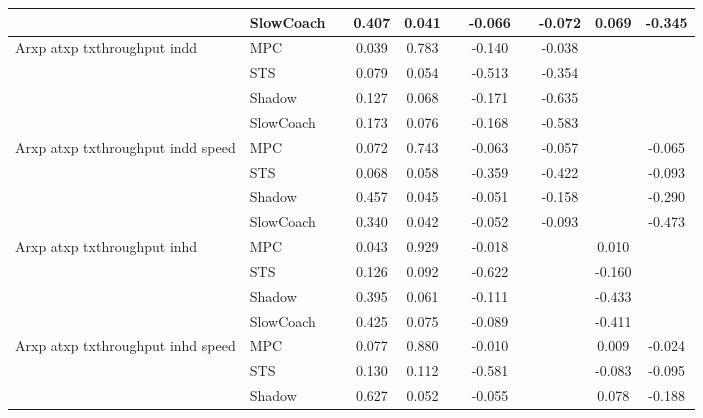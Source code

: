 \begin{tabular}{|l|l|*{9}{c|}}
                              & SlowCoach &       &     0.407 &     0.041 &     & -0.066 &     &  -0.072 &   0.069 &   -0.345 \\
\midrule
Arxp atxp txthroughput indd    & MPC &       &     0.039 &     0.783 &     & -0.140 &     &  -0.038 &      &       \\
                              & STS &       &     0.079 &     0.054 &     & -0.513 &     &  -0.354 &      &       \\
                              & Shadow &       &     0.127 &     0.068 &     & -0.171 &     &  -0.635 &      &       \\
                              & SlowCoach &       &     0.173 &     0.076 &     & -0.168 &     &  -0.583 &      &       \\
\midrule
Arxp atxp txthroughput indd speed    & MPC &       &     0.072 &     0.743 &     & -0.063 &     &  -0.057 &      &   -0.065 \\
                              & STS &       &     0.068 &     0.058 &     & -0.359 &     &  -0.422 &      &   -0.093 \\
                              & Shadow &       &     0.457 &     0.045 &     & -0.051 &     &  -0.158 &      &   -0.290 \\
                              & SlowCoach &       &     0.340 &     0.042 &     & -0.052 &     &  -0.093 &      &   -0.473 \\
\midrule
Arxp atxp txthroughput inhd    & MPC &       &     0.043 &     0.929 &     & -0.018 &     &      &   0.010 &       \\
                              & STS &       &     0.126 &     0.092 &     & -0.622 &     &      &  -0.160 &       \\
                              & Shadow &       &     0.395 &     0.061 &     & -0.111 &     &      &  -0.433 &       \\
                              & SlowCoach &       &     0.425 &     0.075 &     & -0.089 &     &      &  -0.411 &       \\
\midrule
Arxp atxp txthroughput inhd speed    & MPC &       &     0.077 &     0.880 &     & -0.010 &     &      &   0.009 &   -0.024 \\
                              & STS &       &     0.130 &     0.112 &     & -0.581 &     &      &  -0.083 &   -0.095 \\
                              & Shadow &       &     0.627 &     0.052 &     & -0.055 &     &      &   0.078 &   -0.188 \\

\end{tabular}
